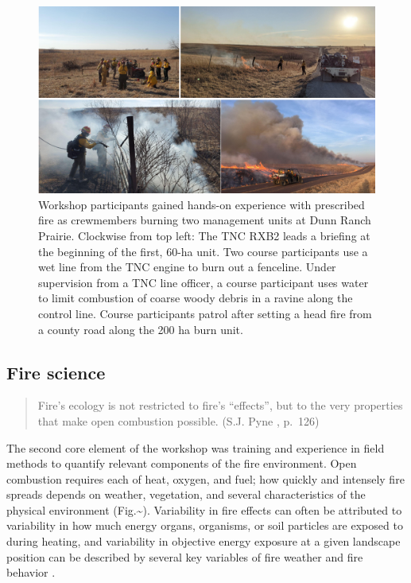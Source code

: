 \documentclass[fire,article,submit,moreauthors,pdftex]{Definitions/mdpi}
\begin{document}
\begin{figure}
\centering
\includegraphics[width=1\columnwidth]{FireExperience.pdf}
\caption{\label{FireExperience}Workshop participants gained hands-on experience with prescribed fire as crewmembers burning two management units at Dunn Ranch Prairie. Clockwise from top left: The TNC RXB2 leads a briefing at the beginning of the first, 60-ha unit. Two course participants use a wet line from the TNC engine to burn out a fenceline. Under supervision from a TNC line officer, a course participant uses water to limit combustion of coarse woody debris in a ravine along the control line. Course participants patrol after setting a head fire from a county road along the 200 ha burn unit.}
\end{figure}

\hypertarget{fire-science}{%
\subsection{Fire science}\label{fire-science}}

\begin{quote}
Fire's ecology is not restricted to fire's ``effects'', but to the very properties that make open combustion possible. (S.J. Pyne \citep{pyne2004}, p.~126)
\end{quote}

The second core element of the workshop was training and experience in field methods to quantify relevant components of the fire environment.
Open combustion requires each of heat, oxygen, and fuel; how quickly and intensely fire spreads depends on weather, vegetation, and several characteristics of the physical environment (Fig.\textasciitilde{}\label{wallet_card}).
Variability in fire effects can often be attributed to variability in how much energy organs, organisms, or soil particles are exposed to during heating, and variability in objective energy exposure at a given landscape position can be described by several key variables of fire weather and fire behavior \citep{mcgranahan2021}.
\end{document}
